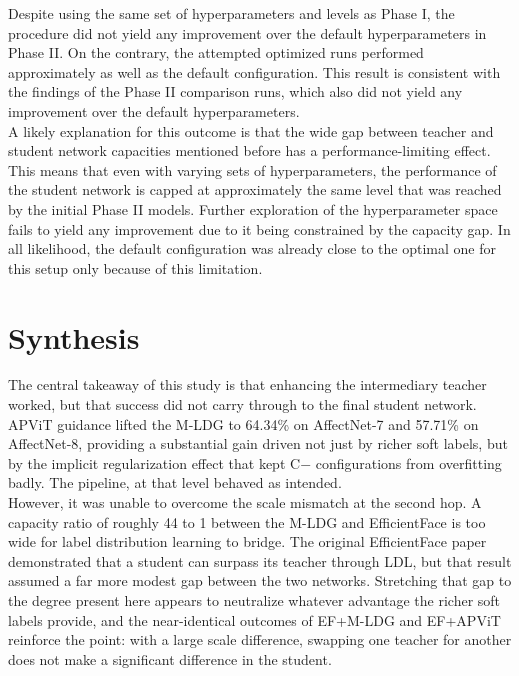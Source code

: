Despite using the same set of hyperparameters and levels as Phase I, the procedure did not yield any improvement over the default hyperparameters in Phase II. On the contrary, the attempted optimized runs performed approximately as well as the default configuration. This result is consistent with the findings of the Phase II comparison runs, which also did not yield any improvement over the default hyperparameters.\\

A likely explanation for this outcome is that the wide gap between teacher and student network capacities mentioned before has a performance-limiting effect. This means that even with varying sets of hyperparameters, the performance of the student network is capped at approximately the same level that was reached by the initial Phase II models. Further exploration of the hyperparameter space fails to yield any improvement due to it being constrained by the capacity gap. In all likelihood, the default configuration was already close to the optimal one for this setup only because of this limitation.

\section{Synthesis}
\label{section:discussion-synthesis}

The central takeaway of this study is that enhancing the intermediary teacher worked, but that success did not carry through to the final student network. APViT guidance lifted the M-LDG to 64.34\% on AffectNet-7 and 57.71\% on AffectNet-8, providing a substantial gain driven not just by richer soft labels, but by the implicit regularization effect that kept C$-$ configurations from overfitting badly. The pipeline, at that level behaved as intended. \\

However, it was unable to overcome the scale mismatch at the second hop. A capacity ratio of roughly 44 to 1 between the M-LDG and EfficientFace is too wide for label distribution learning to bridge. The original EfficientFace paper demonstrated that a student can surpass its teacher through LDL, but that result assumed a far more modest gap between the two networks. Stretching that gap to the degree present here appears to neutralize whatever advantage the richer soft labels provide, and the near-identical outcomes of EF+M-LDG and EF+APViT reinforce the point: with a large scale difference, swapping one teacher for another does not make a significant difference in the student.\\

